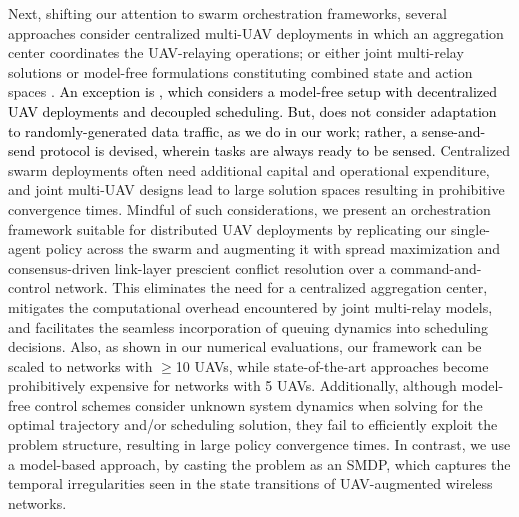 \documentclass[10pt, twocolumn]{IEEEtran}
\theoremstyle{plain}
\theoremstyle{definition}
\theoremstyle{remark}
\newcommand\hlt[1]{\textcolor{black}{#1}}
\begin{document}
Next, shifting our attention to swarm orchestration frameworks, several approaches consider centralized multi-UAV deployments \cite{JointTrajectoryDesign, MultiDroneDeployment, CSCA-ADMM} in which an aggregation center coordinates the UAV-relaying operations; or either joint multi-relay solutions \cite{CSCA-ADMM, GameTheory, UAVDynamicCoverage} or model-free formulations constituting combined state and action spaces \cite{DDQN, MEC-DDPG, DQNPositioning, MLDeployment}. \hlt{An exception is \cite{RLSenseSend}, which considers a model-free setup with decentralized UAV deployments and decoupled scheduling. But, \cite{RLSenseSend} does not consider adaptation to randomly-generated data traffic, as we do in our work; rather, a sense-and-send protocol is devised, wherein tasks are always ready to be sensed.} Centralized swarm deployments often need additional capital and operational expenditure, and joint multi-UAV designs lead to large solution spaces resulting in prohibitive convergence times. Mindful of such considerations, we present an orchestration framework suitable for distributed UAV deployments by replicating our single-agent policy across the swarm and augmenting it with spread maximization and consensus-driven link-layer prescient conflict resolution over a command-and-control network. This eliminates the need for a centralized aggregation center, mitigates the computational overhead encountered by joint multi-relay models, and facilitates the seamless incorporation of queuing dynamics into scheduling decisions. Also, as shown in our numerical evaluations, our framework can be scaled to networks with $\geq$10 UAVs, while state-of-the-art approaches \cite{SCA, CSCA-ADMM, DDQN} become prohibitively expensive for networks with 5 UAVs. Additionally, although model-free control schemes \cite{DDQN, MEC-DDPG, RLSenseSend, DQNPositioning, MLDeployment, UAV-DRL} consider unknown system dynamics when solving for the optimal trajectory and/or scheduling solution, they fail to efficiently exploit the problem structure, resulting in large policy convergence times. In contrast, we use a model-based approach, by casting the problem as an SMDP, which captures the temporal irregularities seen in the state transitions of UAV-augmented wireless networks.
\end{document}
